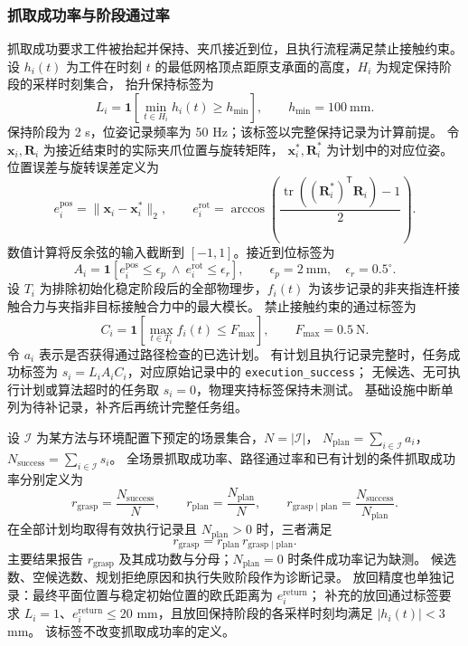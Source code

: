 \documentclass[UTF8,fontset=fandol,a4paper,11pt]{ctexart}
\begin{document}
\subsubsection{抓取成功率与阶段通过率}

抓取成功要求工件被抬起并保持、夹爪接近到位，且执行流程满足禁止接触约束。
设 $h_i(t)$ 为工件在时刻 $t$ 的最低网格顶点距原支承面的高度，$H_i$ 为规定保持阶段的采样时刻集合，
抬升保持标签为
\[
 L_i=\mathbf{1}\!\left[\min_{t\in H_i}h_i(t)\geq h_{\min}\right],
 \qquad h_{\min}=100\ \mathrm{mm}.
\]
保持阶段为 2 s，位姿记录频率为 50 Hz；该标签以完整保持记录为计算前提。
令 $\mathbf x_i,\mathbf R_i$ 为接近结束时的实际夹爪位置与旋转矩阵，
$\mathbf x_i^*,\mathbf R_i^*$ 为计划中的对应位姿。位置误差与旋转误差定义为
\[
 e_i^{\mathrm{pos}}=\|\mathbf x_i-\mathbf x_i^*\|_2,
 \qquad
 e_i^{\mathrm{rot}}=\arccos\!\left(\frac{\operatorname{tr}((\mathbf R_i^*)^{\mathsf T}\mathbf R_i)-1}{2}\right).
\]
数值计算将反余弦的输入截断到 $[-1,1]$。接近到位标签为
\[
 A_i=\mathbf{1}[e_i^{\mathrm{pos}}\leq\epsilon_p\ \land\ e_i^{\mathrm{rot}}\leq\epsilon_r],
 \qquad \epsilon_p=2\ \mathrm{mm},\quad\epsilon_r=0.5^\circ.
\]
设 $T_i$ 为排除初始化稳定阶段后的全部物理步，$f_i(t)$ 为该步记录的非夹指连杆接触合力与夹指非目标接触合力中的最大模长。
禁止接触约束的通过标签为
\[
 C_i=\mathbf{1}\!\left[\max_{t\in T_i}f_i(t)\leq F_{\max}\right],
 \qquad F_{\max}=0.5\ \mathrm N.
\]
令 $a_i$ 表示是否获得通过路径检查的已选计划。
有计划且执行记录完整时，任务成功标签为 $s_i=L_iA_iC_i$，对应原始记录中的 \texttt{execution\_success}；
无候选、无可执行计划或算法超时的任务取 $s_i=0$，物理夹持标签保持未测试。
基础设施中断单列为待补记录，补齐后再统计完整任务组。

设 $\mathcal I$ 为某方法与环境配置下预定的场景集合，$N=|\mathcal I|$，
$N_{\mathrm{plan}}=\sum_{i\in\mathcal I}a_i$，$N_{\mathrm{success}}=\sum_{i\in\mathcal I}s_i$。
全场景抓取成功率、路径通过率和已有计划的条件抓取成功率分别定义为
\[
 r_{\mathrm{grasp}}=\frac{N_{\mathrm{success}}}{N},
 \qquad r_{\mathrm{plan}}=\frac{N_{\mathrm{plan}}}{N},
 \qquad r_{\mathrm{grasp}\mid\mathrm{plan}}=\frac{N_{\mathrm{success}}}{N_{\mathrm{plan}}}.
\]
在全部计划均取得有效执行记录且 $N_{\mathrm{plan}}>0$ 时，三者满足
\[
 r_{\mathrm{grasp}}=r_{\mathrm{plan}}\,r_{\mathrm{grasp}\mid\mathrm{plan}}.
\]
主要结果报告 $r_{\mathrm{grasp}}$ 及其成功数与分母；$N_{\mathrm{plan}}=0$ 时条件成功率记为缺测。
候选数、空候选数、规划拒绝原因和执行失败阶段作为诊断记录。
放回精度也单独记录：最终平面位置与稳定初始位置的欧氏距离为 $e_i^{\mathrm{return}}$；
补充的放回通过标签要求 $L_i=1$、$e_i^{\mathrm{return}}\leq20$ mm，且放回保持阶段的各采样时刻均满足 $|h_i(t)|<3$ mm。
该标签不改变抓取成功率的定义。
\end{document}
